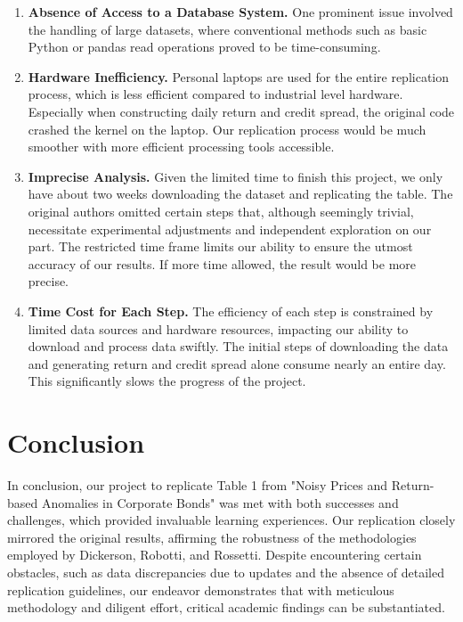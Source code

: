 \documentclass[12pt]{article}
\begin{document}
\begin{enumerate}
    \item \textbf{Absence of Access to a Database System.} One prominent issue involved the handling of large datasets, where conventional methods such as basic Python or pandas read operations proved to be time-consuming.
    \item \textbf{Hardware Inefficiency.} Personal laptops are used for the entire replication process, which is less efficient compared to industrial level hardware. Especially when constructing daily return and credit spread, the original code crashed the kernel on the laptop. Our replication process would be much smoother with more efficient processing tools accessible.
    \item \textbf{Imprecise Analysis.} Given the limited time to finish this project, we only have about two weeks downloading the dataset and replicating the table. The original authors omitted certain steps that, although seemingly trivial, necessitate experimental adjustments and independent exploration on our part. The restricted time frame limits our ability to ensure the utmost accuracy of our results. If more time allowed, the result would be more precise.
    \item \textbf{Time Cost for Each Step.} The efficiency of each step is constrained by limited data sources and hardware resources, impacting our ability to download and process data swiftly. The initial steps of downloading the data and generating return and credit spread alone consume nearly an entire day. This significantly slows the progress of the project.
\end{enumerate}







\section{Conclusion}
In conclusion, our project to replicate Table 1 from "Noisy Prices and Return-based Anomalies in Corporate Bonds" was met with both successes and challenges, which provided invaluable learning experiences. Our replication closely mirrored the original results, affirming the robustness of the methodologies employed by Dickerson, Robotti, and Rossetti. Despite encountering certain obstacles, such as data discrepancies due to updates and the absence of detailed replication guidelines, our endeavor demonstrates that with meticulous methodology and diligent effort, critical academic findings can be substantiated.





\end{document}
